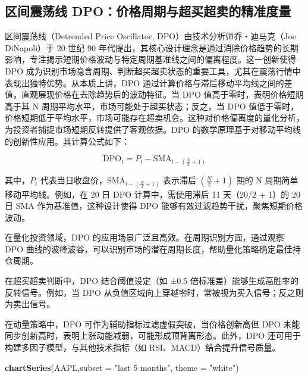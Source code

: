 \documentclass[]{ctexbook}
\newenvironment{Shaded}{\begin{snugshade}}{\end{snugshade}}
\newcommand{\AttributeTok}[1]{\textcolor[rgb]{0.13,0.29,0.53}{#1}}
\newcommand{\FunctionTok}[1]{\textcolor[rgb]{0.13,0.29,0.53}{\textbf{#1}}}
\newcommand{\NormalTok}[1]{#1}
\newcommand{\StringTok}[1]{\textcolor[rgb]{0.31,0.60,0.02}{#1}}
\begin{document}
\subsection{区间震荡线 DPO：价格周期与超买超卖的精准度量}\label{ux533aux95f4ux9707ux8361ux7ebf-dpoux4ef7ux683cux5468ux671fux4e0eux8d85ux4e70ux8d85ux5356ux7684ux7cbeux51c6ux5ea6ux91cf}

区间震荡线（Detrended Price Oscillator, DPO）由技术分析师乔・迪马克（Joe DiNapoli）于 20 世纪 90 年代提出，其核心设计理念是通过消除价格趋势的长期影响，专注揭示短期价格波动与特定周期基准线之间的偏离程度。这一创新使得 DPO 成为识别市场隐含周期、判断超买超卖状态的重要工具，尤其在震荡行情中表现出独特优势。从本质上讲，DPO 通过计算价格与滞后移动平均线之间的差值，直观展现价格在去除趋势后的波动特征。当 DPO 值高于零时，表明价格短期高于其 N 周期平均水平，市场可能处于超买状态；反之，当 DPO 值低于零时，价格短期低于平均水平，市场可能存在超卖机会。这种对价格偏离度的量化分析，为投资者捕捉市场短期反转提供了客观依据。DPO 的数学原理基于对移动平均线的创新性应用。其计算公式如下：

\[\text{DPO}_t = P_t - \text{SMA}_{t - \left(\frac{N}{2} + 1\right)}\]

其中，\(P_t\) 代表当日收盘价，\(\text{SMA}_{t - \left(\frac{N}{2} + 1\right)}\) 表示滞后 \(\left(\frac{N}{2} + 1\right)\) 期的 N 周期简单移动平均线。例如，在 20 日 DPO 计算中，需使用滞后 11 天（20/2 + 1）的 20 日 SMA 作为基准值，这种设计使得 DPO 能够有效过滤趋势干扰，聚焦短期价格波动。

在量化投资领域，DPO 的应用场景广泛且高效。在周期识别方面，通过观察 DPO 曲线的波峰波谷，可以识别市场的潜在周期长度，帮助量化策略确定最佳持仓周期。

在超买超卖判断中，DPO 结合阈值设定（如 ±0.5 倍标准差）能够生成高胜率的反转信号。例如，当 DPO 从负值区域向上穿越零时，常被视为买入信号；反之则为卖出信号。

在动量策略中，DPO 可作为辅助指标过滤虚假突破，当价格创新高但 DPO 未能同步创新高时，表明上涨动能减弱，可能形成顶背离形态。此外，DPO 还可用于构建多因子模型，与其他技术指标（如 RSI、MACD）结合提升信号质量。

\begin{Shaded}
\begin{Highlighting}[]
\FunctionTok{chartSeries}\NormalTok{(AAPL,}\AttributeTok{subset =} \StringTok{"last 5 months"}\NormalTok{, }\AttributeTok{theme =} \StringTok{"white"}\NormalTok{)}
\end{Highlighting}
\end{Shaded}
\end{document}
